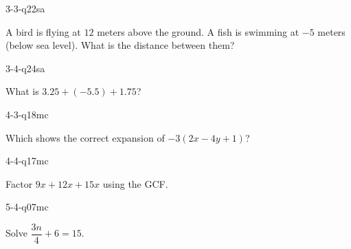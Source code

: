 \begin{practiceQuestion}{3-3-q22}{sa}
\begin{questionText}
A bird is flying at $12$ meters above the ground. A fish is swimming at $-5$ meters (below sea level). What is the distance between them?
\end{questionText}
\end{practiceQuestion}

\begin{practiceQuestion}{3-4-q24}{sa}
\begin{questionText}
What is $3.25 + (-5.5) + 1.75$?
\end{questionText}
\end{practiceQuestion}

\begin{practiceQuestion}{4-3-q18}{mc}
\begin{questionText}
Which shows the correct expansion of $-3(2x - 4y + 1)$?
\end{questionText}
\end{practiceQuestion}

\begin{practiceQuestion}{4-4-q17}{mc}
\begin{questionText}
Factor $9x + 12x + 15x$ using the GCF.
\end{questionText}
\end{practiceQuestion}

\begin{practiceQuestion}{5-4-q07}{mc}
\begin{questionText}
Solve $\dfrac{3n}{4} + 6 = 15$.
\end{questionText}
\end{practiceQuestion}

